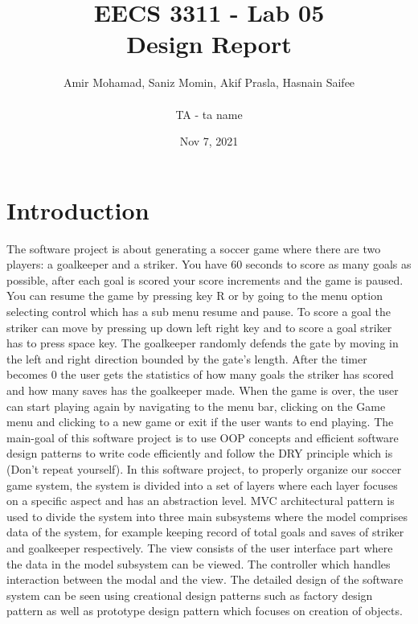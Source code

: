 \documentclass[12pt, dvipsnames, a4paper]{article}
\begin{document}
\title{\textbf{EECS 3311 - Lab 05\\Design Report}}
\author{Amir Mohamad, Saniz Momin, Akif Prasla, Hasnain Saifee\\\\TA - ta name}
\date{Nov 7, 2021}
\maketitle
\tableofcontents
\clearpage

\section{Introduction}

The software project is about generating a soccer game where there are two players:
a goalkeeper and a striker. You have 60 seconds to score as many goals as possible,
after each goal is scored your score increments and the game is paused. You can resume
the game by pressing key R or by going to the menu option selecting control which has a
sub menu resume and pause. To score a goal the striker can move by pressing up down left
right key and to score a goal striker has to press space key. The goalkeeper randomly defends
the gate by moving in the left and right direction bounded by the gate's length. After the
timer becomes 0 the user gets the statistics of how many goals the striker has scored and how
many saves has the goalkeeper made. When the game is over, the user can start playing again
by navigating to the menu bar, clicking on the Game menu and clicking to a new game or exit
if the user wants to end playing. The main-goal of this software project is to use OOP concepts
and efficient software design patterns to write code efficiently and follow the DRY principle
which is (Don't repeat yourself). In this software project, to properly organize our soccer
game system, the system is divided into a set of layers where each layer focuses on a
specific aspect and has an abstraction level. MVC architectural pattern is used to divide
the system into three main subsystems where the model comprises data of the system, for
example keeping record of total goals and saves of striker and goalkeeper respectively.
The view consists of the user interface part where the data in the model subsystem can be
viewed. The controller which handles interaction between the modal and the view. The detailed
design of the software system can be seen using creational design patterns such as factory
design pattern as well as prototype design pattern which focuses on creation of objects.
\end{document}

